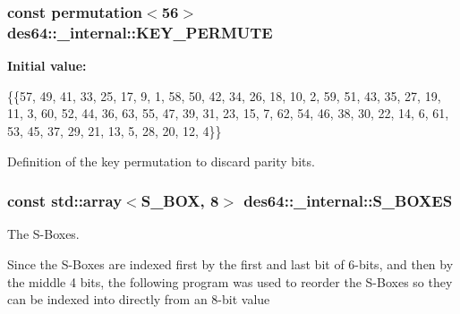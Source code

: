 \subsubsection[{\texorpdfstring{K\+E\+Y\+\_\+\+P\+E\+R\+M\+U\+TE}{KEY_PERMUTE}}]{\setlength{\rightskip}{0pt plus 5cm}const {\bf permutation}$<$56$>$ des64\+::\+\_\+internal\+::\+K\+E\+Y\+\_\+\+P\+E\+R\+M\+U\+TE}\hypertarget{namespacedes64_1_1__internal_a9bfe541be2b8bbf16d7e323e6bc55432}{}\label{namespacedes64_1_1__internal_a9bfe541be2b8bbf16d7e323e6bc55432}
{\bfseries Initial value\+:}
\begin{DoxyCode}
\{\{57, 49, 41, 33, 25, 17, 9, 1, 58, 50, 42, 34, 26, 18, 10, 2, 59, 51,
        43, 35, 27, 19, 11, 3, 60, 52, 44, 36, 63, 55, 47, 39, 31, 23, 15, 7,
        62, 54, 46, 38, 30, 22, 14, 6, 61, 53, 45, 37, 29, 21, 13, 5, 28, 20, 12, 4\}\}
\end{DoxyCode}


Definition of the key permutation to discard parity bits. 

\subsubsection[{\texorpdfstring{S\+\_\+\+B\+O\+X\+ES}{S_BOXES}}]{\setlength{\rightskip}{0pt plus 5cm}const std\+::array$<${\bf S\+\_\+\+B\+OX}, 8$>$ des64\+::\+\_\+internal\+::\+S\+\_\+\+B\+O\+X\+ES}\hypertarget{namespacedes64_1_1__internal_ab6b95bc050b8e9ce0fe63190e204b022}{}\label{namespacedes64_1_1__internal_ab6b95bc050b8e9ce0fe63190e204b022}


The S-\/\+Boxes. 

Since the S-\/\+Boxes are indexed first by the first and last bit of 6-\/bits, and then by the middle 4 bits, the following program was used to reorder the S-\/\+Boxes so they can be indexed into directly from an 8-\/bit value


